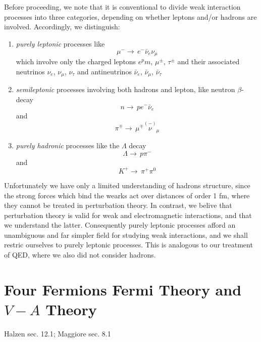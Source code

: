 \documentclass[TheoreticalPhy_ModB.tex]{subfiles}
\begin{document}
Before proceeding, we note that it is conventional to divide weak interaction processes into three categories, depending on whether leptons and/or hadrons are involved. Accordingly, we distinguish:
\begin{enumerate}
\item \emph{purely leptonic} processes like
\[\mu^-\to\, e^-\bar\nu_e\nu_\mu\]
which involve only the charged leptons $e^pm$, $\mu^\pm$, $\tau^\pm$ and their associated neutrinos $\nu_e$, $\nu_\mu$, $\nu_\tau$ and antineutrinos $\bar\nu_e$, $\bar\nu_\mu$, $\bar\nu_\tau$
\item \emph{semileptonic} processes involving both hadrons and lepton, like neutron $\beta$-decay
\[n\to\, pe^-\bar\nu_e\]
and 
\[\pi^\mp\to\,\mu^\mp\overset{(-)}{\nu}_\mu\]
\item \emph{purely hadronic} processes like the $\Lambda$ decay
\[\Lambda\to\, p\pi^-\]
and
\[K^+\to\,\pi^+\pi^0\]
\end{enumerate}

Unfortunately we have only a limited understanding of hadrons structure, since the strong forces which bind the wearks act over distances of order 1 fm, where they cannot be treated in perturbation theory. In contrast, we belive that perturbation theory is valid for weak and electromagnetic interactions, and that we understand the latter. Consequently purely leptonic processes afford an unambiguous and far simpler field for studying weak interactions, and we shall restric ourselves to purely leptonic processes. This is analogous to our treatment of QED, where we also did not consider hadrons. 

\section{Four Fermions Fermi Theory and $V-A$ Theory}\label{sec:4-fermions-and-VA}
\textsf{Halzen sec. 12.1; Maggiore sec. 8.1}\\
\end{document}
